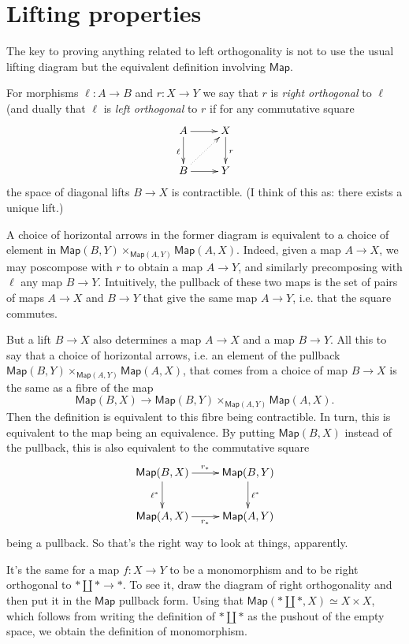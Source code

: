 \section{Lifting properties}
\label{section-lifting-properties}

The key to proving anything related
to left orthogonality is not to use
the usual lifting diagram but
the equivalent definition involving $\mathsf{Map}$.

\begin{definition}
\label{definition-orthogonal}
For morphisms $\ell:A \to B$ and $r:X \to Y$ 
we say that $r$ is {\it right orthogonal} 
to $\ell$ (and dually that $\ell$ is 
{\it left orthogonal} to  $r$ if
for any commutative square
$$
\xymatrix{
A\ar[r]\ar[d]_{\ell}&X\ar[d]^{r}\\
B\ar@{.>}[ur]\ar[r]&Y
}
$$
the space of diagonal lifts $B \to X$ is contractible.
(I think of this as: there exists a unique lift.)
\end{definition}

\noindent
A choice of horizontal arrows in the former
diagram is equivalent to a choice of element in
$\mathsf{Map}(B,Y)\times_{\mathsf{Map}(A,Y)}\mathsf{Map}(A,X)$.
Indeed, given a map $A\to X$,
we may poscompose with $r$ to obtain
a map $A \to Y$, and similarly precomposing with 
$\ell$ any map $B \to Y$.
Intuitively, the pullback
of these two maps is the set of pairs
of maps $A \to X$ and $B \to Y$
that give the same map  $A \to Y$,
i.e. that the square commutes.

But a lift $B \to X$ also determines
a map $A \to X$ and 
a map $B \to Y$.
All this to say that 
a choice of horizontal arrows,
i.e. an element of the pullback
$\mathsf{Map}(B,Y) \times_{\mathsf{Map}(A,Y)}\mathsf{Map}(A,X)$,
that comes from a choice of map
$B \to X$ is the same as 
a fibre of the map
$$
\mathsf{Map}(B,X) \to 
\mathsf{Map}(B,Y) \times_{\mathsf{Map}(A,Y)}\mathsf{Map}(A,X).
$$
Then the definition is equivalent
to this fibre being contractible.
In turn, this is equivalent to the
map being an equivalence.
By putting $\mathsf{Map}(B,X)$ instead
of the pullback, this is also equivalent
to the commutative square
$$
\xymatrix{
\mathsf{Map}(B,X)\ar[r]^{r_*}\ar[d]_{\ell^*}&\mathsf{Map}(B,Y)\ar[d]^{\ell^*}\\
\mathsf{Map}(A,X)\ar[r]_{r_*}&\mathsf{Map}(A,Y)
}
$$
being a pullback. So that's the
right way to look at things, apparently.

\begin{example}
\label{example-monomorphism-iff-right-orthogonal-to-pushout}
It's the same for a map $f:X \to Y$ to be
a monomorphism and to be
right orthogonal to $* \amalg * \to *$.
To see it, draw the diagram of right orthogonality
and then put it in the $\mathsf{Map}$ pullback form.
Using that $\mathsf{Map}(* \amalg *,X)\simeq X\times X$,
which follows from writing the
definition of $* \amalg *$ as the pushout of
the empty space, we obtain the definition of
monomorphism.
\end{example}


